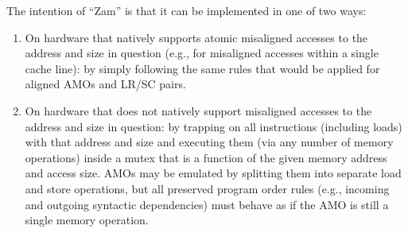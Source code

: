 \begin{commentary}
  The intention of ``Zam'' is that it can be implemented in one of two ways:
  \begin{enumerate}
    \item On hardware that natively supports atomic misaligned accesses to the address and size in question (e.g., for misaligned accesses within a single cache line): by simply following the same rules that would be applied for aligned AMOs and LR/SC pairs.
    \item On hardware that does not natively support misaligned accesses to the address and size in question: by trapping on all instructions (including loads) with that address and size and executing them (via any number of memory operations) inside a mutex that is a function of the given memory address and access size.  AMOs may be emulated by splitting them into separate load and store operations, but all preserved program order rules (e.g., incoming and outgoing syntactic dependencies) must behave as if the AMO is still a single memory operation.
  \end{enumerate}
\end{commentary}
